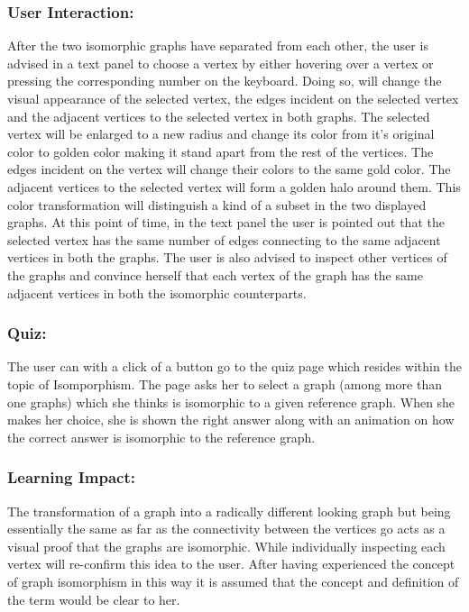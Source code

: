 \subsubsection{User Interaction:}
After the two isomorphic graphs have separated from each other, the user is
advised in a text panel to choose a vertex by either hovering over a vertex or
pressing the corresponding number on the keyboard. Doing so, will change the
visual appearance of the selected vertex, the edges incident on the selected
vertex and the adjacent vertices to the selected vertex in both graphs.  The
selected vertex will be enlarged to a new radius and change its color from it's
original color to golden color making it stand apart from the rest of the
vertices.  The edges incident on the vertex will change their colors to the
same gold color.  The adjacent vertices to the selected vertex will form a
golden halo around them.  This color transformation will distinguish a kind of
a subset in the two displayed graphs. At this point of time, in the text panel
the user is pointed out that the selected vertex has the same number of edges
connecting to the same adjacent vertices in both the graphs.  The user is also
advised to inspect other vertices of the graphs and convince herself that each
vertex of the graph has the same adjacent vertices in both the isomorphic
counterparts.

\subsubsection{Quiz:}
The user can with a click of a button go to the quiz page which resides within
the topic of Isomporphism. The page asks her to select a graph (among more than
one graphs) which she thinks is isomorphic to a given reference graph.  When
she makes her choice, she is shown the right answer along with an animation on
how the correct answer is isomorphic to the reference graph.

\subsubsection{Learning Impact:}
The transformation of a graph into a radically different looking graph but
being essentially the same as far as the connectivity between the vertices go
acts as a visual proof that the graphs are isomorphic.  While individually
inspecting each vertex will re-confirm this idea to the user. After having
experienced the concept of graph isomorphism in this way it is assumed that the
concept and definition of the term would be clear to her.


